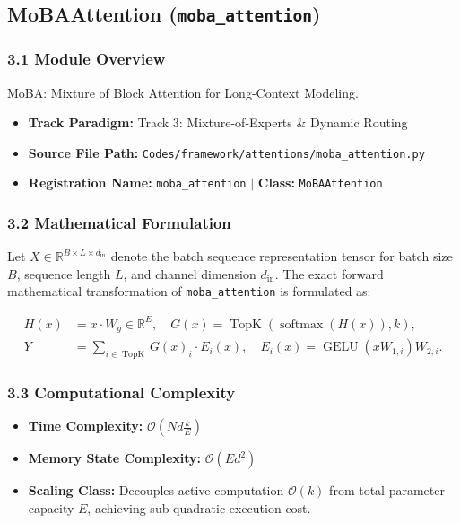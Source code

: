 \subsection{MoBAAttention (\texttt{moba\_attention})}
\label{sec:app_module_moba_attention}

\subsubsection*{3.1 Module Overview}
MoBA: Mixture of Block Attention for Long-Context Modeling.
\begin{itemize}
    \item \textbf{Track Paradigm:} Track 3: Mixture-of-Experts \& Dynamic Routing
    \item \textbf{Source File Path:} \texttt{Codes/framework/attentions/moba\_attention.py}
    \item \textbf{Registration Name:} \texttt{moba\_attention} $\mid$ \textbf{Class:} \texttt{MoBAAttention}
\end{itemize}

\subsubsection*{3.2 Mathematical Formulation}
Let $X \in \mathbb{R}^{B \times L \times d_{\text{in}}}$ denote the batch sequence representation tensor for batch size $B$, sequence length $L$, and channel dimension $d_{\text{in}}$. The exact forward mathematical transformation of \texttt{moba\_attention} is formulated as:

\begin{align}
H(x) &= x \cdot W_g \in \mathbb{R}^{E}, \quad G(x) = \operatorname{TopK}\left(\operatorname{softmax}(H(x)), k\right), \\
Y &= \sum_{i \in \operatorname{TopK}} G(x)_i \cdot E_i(x), \quad E_i(x) = \operatorname{GELU}(x W_{1, i}) W_{2, i}.
\end{align}


\subsubsection*{3.3 Computational Complexity}
\begin{itemize}
    \item \textbf{Time Complexity:} $\mathcal{O}(N d \frac{k}{E})$
    \item \textbf{Memory State Complexity:} $\mathcal{O}(E d^2)$
    \item \textbf{Scaling Class:} Decouples active computation $\mathcal{O}(k)$ from total parameter capacity $E$, achieving sub-quadratic execution cost.
\end{itemize}

